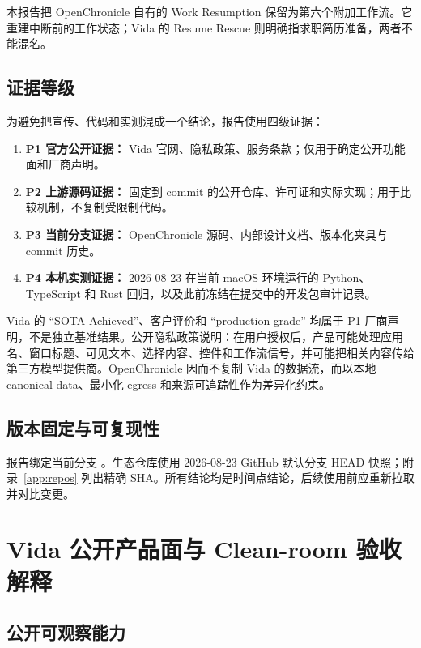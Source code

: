 \documentclass[UTF8,fontset=none,zihao=-4,openany]{ctexrep}
\newcommand{\code}[1]{\texttt{\detokenize{#1}}}
\begin{document}
本报告把 OpenChronicle 自有的 Work Resumption 保留为第六个附加工作流。它重建中断前的工作状态；Vida 的 Resume Rescue 则明确指求职简历准备\cite{vida-home}，两者不能混名。

\section{证据等级}

为避免把宣传、代码和实测混成一个结论，报告使用四级证据：

\begin{enumerate}
  \item \textbf{P1 官方公开证据：} Vida 官网、隐私政策、服务条款；仅用于确定公开功能面和厂商声明。
  \item \textbf{P2 上游源码证据：} 固定到 commit 的公开仓库、许可证和实际实现；用于比较机制，不复制受限制代码。
  \item \textbf{P3 当前分支证据：} OpenChronicle 源码、内部设计文档、版本化夹具与 commit 历史。
  \item \textbf{P4 本机实测证据：} 2026-08-23 在当前 macOS 环境运行的 Python、TypeScript 和 Rust 回归，以及此前冻结在提交中的开发包审计记录。
\end{enumerate}

Vida 的 “SOTA Achieved”、客户评价和 “production-grade” 均属于 P1 厂商声明，不是独立基准结果。公开隐私政策说明：在用户授权后，产品可能处理应用名、窗口标题、可见文本、选择内容、控件和工作流信号，并可能把相关内容传给第三方模型提供商\cite{vida-privacy}。OpenChronicle 因而不复制 Vida 的数据流，而以本地 canonical data、最小化 egress 和来源可追踪性作为差异化约束。

\section{版本固定与可复现性}

报告绑定当前分支 \code{bf34152}。生态仓库使用 2026-08-23 GitHub 默认分支 HEAD 快照；附录~\ref{app:repos} 列出精确 SHA。所有结论均是时间点结论，后续使用前应重新拉取并对比变更。

\chapter{Vida 公开产品面与 Clean-room 验收解释}

\section{公开可观察能力}
\end{document}
